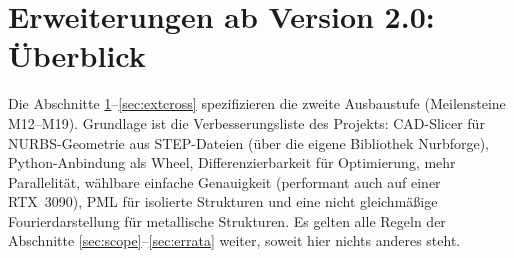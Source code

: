 \clearpage
\section{Erweiterungen ab Version 2.0: Überblick}\label{sec:ext}
Die Abschnitte \ref{sec:ext}--\ref{sec:extcross} spezifizieren die zweite Ausbaustufe (Meilensteine M12--M19).
Grundlage ist die Verbesserungsliste des Projekts:
CAD-Slicer für NURBS-Geometrie aus STEP-Dateien (über die eigene Bibliothek Nurbforge),
Python-Anbindung als Wheel, Differenzierbarkeit für Optimierung, mehr Parallelität, wählbare einfache
Genauigkeit (performant auch auf einer RTX~3090), PML für isolierte Strukturen und eine nicht gleichmäßige
Fourierdarstellung für metallische Strukturen. Es gelten alle Regeln der Abschnitte
\ref{sec:scope}--\ref{sec:errata} weiter, soweit hier nichts anderes steht.

